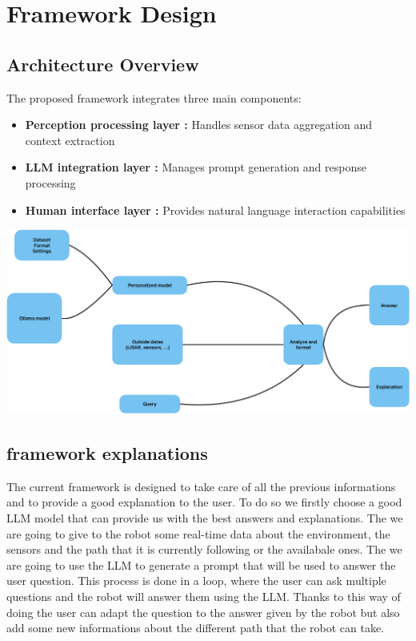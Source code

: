 \section{Framework Design}

\subsection{Architecture Overview}

The proposed framework integrates three main components:
\begin{itemize}
    \item \textbf{Perception processing layer :} Handles sensor data aggregation and context extraction
    \item \textbf{LLM integration layer :} Manages prompt generation and response processing
    \item \textbf{Human interface layer :} Provides natural language interaction capabilities
\end{itemize}

\begin{center}
    \includegraphics[scale=0.45]{figures/Model-HCI.png}
\end{center}

\subsection{framework explanations}
The current framework is designed to take care of all the previous informations and to provide a good explanation to the user.
To do so we firstly choose a good LLM model that can provide us with the best answers and explanations.
The we are going to give to the robot some real-time data about the environment, the sensors and the path that it is currently following or the  availabale ones.
The we are going to use the LLM to generate a prompt that will be used to answer the user question.
This process is done in a loop, where the user can ask multiple questions and the robot will answer them using the LLM.
Thanks to this way of doing the user can adapt the question to the answer given by the robot but also add some new informations about the different path that the robot can take.

